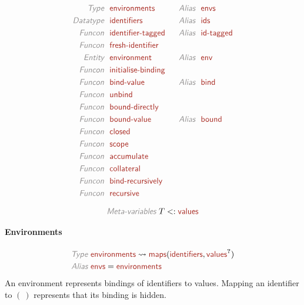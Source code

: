 \documentclass[fleqn]{article}
\newcommand{\KEY}[1]{\textsf{\textit{\color{Gray}#1}}}
\newcommand{\NAME}[2][\PLAIN]{#1{Name_#2}{\textsf{\color{Mahogany}#2}}}
\newcommand{\PLAIN}[1]{}
\newcommand{\QUERY}{^{\text{\bf?}}}
\begin{document}
\begin{alignat*}{2}
  \KEY{Type} ~~    & \NAME{environments}       &~~& \KEY{Alias} ~~ \NAME{envs}
  \\
  \KEY{Datatype} ~~ & \NAME{identifiers}        & & \KEY{Alias} ~~ \NAME{ids}
  \\
  \KEY{Funcon} ~~  & \NAME{identifier-tagged}  & & \KEY{Alias} ~~ \NAME{id-tagged}
  \\
  \KEY{Funcon} ~~  & \NAME{fresh-identifier}
  \\
  \KEY{Entity} ~~  & \NAME{environment}        & & \KEY{Alias} ~~ \NAME{env}
  \\
  \KEY{Funcon} ~~  & \NAME{initialise-binding}
  \\
  \KEY{Funcon} ~~  & \NAME{bind-value}         & & \KEY{Alias} ~~ \NAME{bind}
  \\
  \KEY{Funcon} ~~  & \NAME{unbind}
  \\
  \KEY{Funcon} ~~  & \NAME{bound-directly}
  \\
  \KEY{Funcon} ~~  & \NAME{bound-value}        & & \KEY{Alias} ~~ \NAME{bound}
  \\
  \KEY{Funcon} ~~  & \NAME{closed}
  \\
  \KEY{Funcon} ~~  & \NAME{scope}
  \\
  \KEY{Funcon} ~~  & \NAME{accumulate}
  \\
  \KEY{Funcon} ~~  & \NAME{collateral}
  \\
  \KEY{Funcon} ~~  & \NAME{bind-recursively}
  \\
  \KEY{Funcon} ~~  & \NAME{recursive}
\end{alignat*}

\[ %
\KEY{Meta-variables} ~
  T <: \NAME{values}
\] %

\paragraph*{Environments}

\begin{align*}
  \KEY{Type} ~
  & \NAME{environments} \leadsto \NAME{maps}(\NAME{identifiers}, \NAME{values}\QUERY)
\\
  \KEY{Alias} ~
  & \NAME{envs} = \NAME{environments}
\end{align*}
% 
An environment represents bindings of identifiers to values.
Mapping an identifier to $ (~) $ represents that its binding is hidden.
\end{document}
